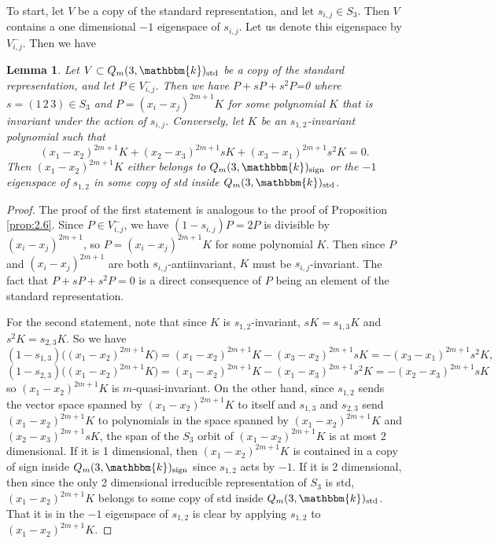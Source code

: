 \documentclass[11pt]{article}
\newtheorem{lemma}[theorem]{Lemma}
\theoremstyle{definition}
\renewcommand{\k}{\mathbbm{k}}
\newcommand{\std}{\mathrm{std}}
\newcommand{\sgn}{\mathrm{sign}}
\begin{document}
To start, let $V$ be a copy of the standard representation, and let $s_{i,j}\in S_3$. Then $V$ contains a one dimensional $-1$ eigenspace of $s_{i,j}$. Let us denote this eigenspace by $V_{i,j}^-$. Then we have

\begin{lemma}\label{lem:3.2}
    Let $V\subset Q_m(3,\k)_\std$ be a copy of the standard representation, and let $P\in V_{i,j}^-$. Then we have $P+sP+s^2P$=0 where $s=(1\,2\,3)\in S_3$ and $P=(x_i-x_j)^{2m+1}K$ for some polynomial $K$ that is invariant under the action of $s_{i,j}$. Conversely, let $K$ be an $s_{1,2}$-invariant polynomial such that 
    $$(x_1-x_2)^{2m+1}K+(x_2-x_3)^{2m+1}sK+(x_3-x_1)^{2m+1}s^2K=0.$$
    Then $(x_1-x_2)^{2m+1}K$ either belongs to $Q_m(3,\k)_\sgn$ or the $-1$ eigenspace of $s_{1,2}$ in some copy of std inside $Q_m(3,\k)_\std$.
\end{lemma}
\begin{proof}
    The proof of the first statement is analogous to the proof of Proposition \ref{prop:2.6}. Since $P\in V_{i,j}^-$, we have $(1-s_{i,j})P=2P$ is divisible by $(x_i-x_j)^{2m+1}$, so $P=(x_i-x_j)^{2m+1}K$ for some polynomial $K$. Then since $P$ and $(x_i-x_j)^{2m+1}$ are both $s_{i,j}$-antiinvariant, $K$ must be $s_{i,j}$-invariant. The fact that $P+sP+s^2P=0$ is a direct consequence of $P$ being an element of the standard representation.
    
    For the second statement, note that since $K$ is $s_{1,2}$-invariant, $sK=s_{1,3}K$ and $s^2K=s_{2,3}K$. So we have
    $$(1-s_{1,3})\Big((x_1-x_2)^{2m+1}K\Big)=(x_1-x_2)^{2m+1}K-(x_3-x_2)^{2m+1}sK=-(x_3-x_1)^{2m+1}s^2K,$$
    $$(1-s_{2,3})\Big((x_1-x_2)^{2m+1}K\Big)=(x_1-x_2)^{2m+1}K-(x_1-x_3)^{2m+1}s^2K=-(x_2-x_3)^{2m+1}sK$$
    so $(x_1-x_2)^{2m+1}K$ is $m$-quasi-invariant. On the other hand, since $s_{1,2}$ sends the vector space spanned by $(x_1-x_2)^{2m+1}K$ to itself and $s_{1,3}$ and $s_{2,3}$ send $(x_1-x_2)^{2m+1}K$ to polynomials in the space spanned by $(x_1-x_2)^{2m+1}K$ and $(x_2-x_3)^{2m+1}sK$, the span of the $S_3$ orbit of $(x_1-x_2)^{2m+1}K$ is at most 2 dimensional. If it is 1 dimensional, then $(x_1-x_2)^{2m+1}K$ is contained in a copy of sign inside $Q_m(3,\k)_\sgn$ since $s_{1,2}$ acts by $-1$. If it is 2 dimensional, then since the only 2 dimensional irreducible representation of $S_3$ is std, $(x_1-x_2)^{2m+1}K$ belongs to some copy of std inside $Q_m(3,\k)_\std$. That it is in the $-1$ eigenspace of $s_{1,2}$ is clear by applying $s_{1,2}$ to $(x_1-x_2)^{2m+1}K$.
\end{proof}
\end{document}
